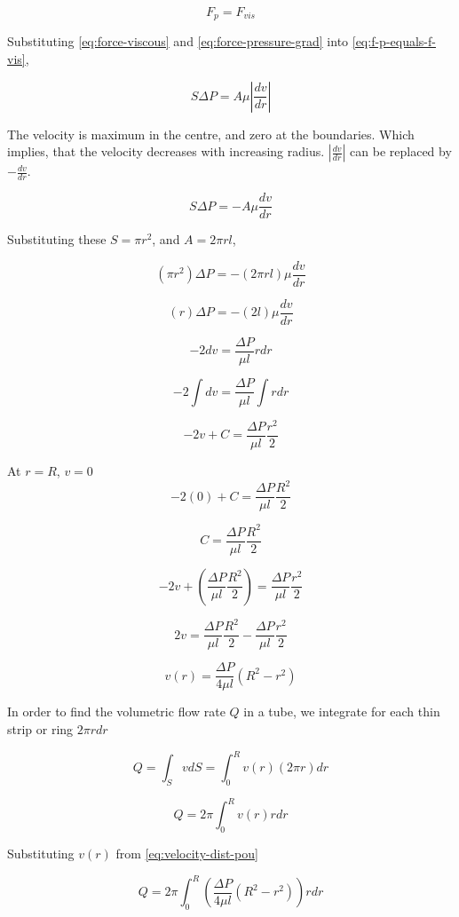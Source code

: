 	\begin{equation} \label{eq:f-p-equals-f-vis}
		F_{p} = F_{vis}
	\end{equation}
	
	Substituting \ref{eq:force-viscous} and \ref{eq:force-pressure-grad} into \ref{eq:f-p-equals-f-vis},
	
	\[ S \Delta P = A \mu \left| \frac{dv}{dr} \right| \]
	
	The velocity is maximum in the centre, and zero at the boundaries. Which implies, that the velocity decreases with increasing radius. $\left| \frac{dv}{dr} \right|$ can be replaced by $ -\frac{dv}{dr}$.
	
	\[ S \Delta P = -A \mu \frac{dv}{dr} \]
	
	Substituting these $S = \pi r^2$, and $A = 2 \pi r l$,
	
	\[ (\pi r^2) \Delta P = -(2 \pi r l) \mu \frac{dv}{dr} \]
	
	\[ (r) \Delta P = -(2 l) \mu \frac{dv}{dr} \]
	
	\[ -2dv = \frac{\Delta P}{\mu l} r dr \]
	
	\[ -2 \int dv = \frac{\Delta P}{\mu l} \int r dr \]
	
	\[ -2v + C = \frac{\Delta P}{\mu l} \frac{r^2}{2} \]
	
	At $r = R$, $v = 0$
	\[ -2(0) + C = \frac{\Delta P}{\mu l} \frac{R^2}{2} \]
	
	\[ C = \frac{\Delta P}{\mu l} \frac{R^2}{2} \]
	
	\[ -2v + \left( \frac{\Delta P}{\mu l} \frac{R^2}{2} \right) = \frac{\Delta P}{\mu l} \frac{r^2}{2} \]
	
	\[2v = \frac{\Delta P}{\mu l} \frac{R^2}{2} - \frac{\Delta P}{\mu l} \frac{r^2}{2} \]
	
	\begin{equation} \label{eq:velocity-dist-pou}
		v(r) = \frac{\Delta P}{4 \mu l} (R^2 - r^2)
	\end{equation}
	
	In order to find the volumetric flow rate $Q$ in a tube, we integrate for each thin strip or ring $2 \pi r dr$
	
	\[ Q = \int_{S} vdS = \int_{0}^{R} v(r) (2 \pi r) dr \]
	
	\[ Q = 2 \pi \int_{0}^{R} v(r) r dr \]
	
	Substituting $v(r)$ from \ref{eq:velocity-dist-pou}
	
	\[ Q = 2 \pi \int_{0}^{R} \left( \frac{\Delta P}{4 \mu l} (R^2 - r^2)\right) r dr \]
	
